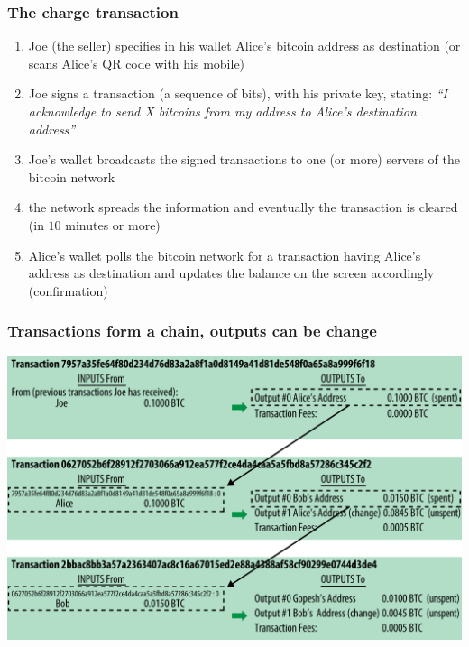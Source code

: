 \documentclass[11pt]{beamer}  %
\begin{document}
\begin{frame}\frametitle{The charge transaction}

  \begin{enumerate}
  \item Joe (the seller) specifies in his wallet Alice's bitcoin address
    as destination (or scans Alice's QR code with his mobile)
  \item Joe signs a transaction (a sequence of bits),
    with his private key, stating: \emph{``I acknowledge
    to send X bitcoins from my address to Alice's destination address''}
  \item Joe's wallet broadcasts the signed transactions
    to one (or more) servers of the bitcoin network
  \item the network spreads the information and eventually the transaction is cleared
    (in $10$ minutes or more)
  \item Alice's wallet polls the bitcoin network for a transaction having
    Alice's address as destination and updates the balance on the screen
    accordingly (\alert{confirmation})
  \end{enumerate}

\end{frame}

\begin{frame}\frametitle{Transactions form a chain, outputs can be change}

  \begin{center}
    \includegraphics[scale=0.23,clip=false]{pictures/mbc2_0204.png}
  \end{center}

\end{frame}
\end{document}
